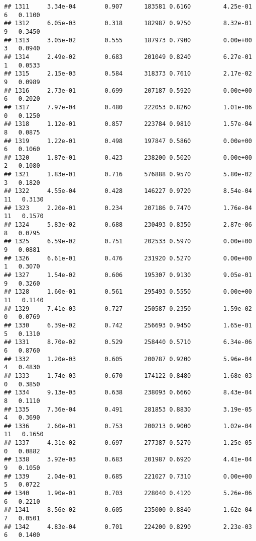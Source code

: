 \documentclass[
]{article}
\begin{document}
\begin{verbatim}
## 1311     3.34e-04        0.907      183581 0.6160         4.25e-01   6   0.1100
## 1312     6.05e-03        0.318      182987 0.9750         8.32e-01   9   0.3450
## 1313     3.05e-02        0.555      187973 0.7900         0.00e+00   3   0.0940
## 1314     2.49e-02        0.683      201049 0.8240         6.27e-01   1   0.0533
## 1315     2.15e-03        0.584      318373 0.7610         2.17e-02   9   0.0989
## 1316     2.73e-01        0.699      207187 0.5920         0.00e+00   6   0.2020
## 1317     7.97e-04        0.480      222053 0.8260         1.01e-06   0   0.1250
## 1318     1.12e-01        0.857      223784 0.9810         1.57e-04   8   0.0875
## 1319     1.22e-01        0.498      197847 0.5860         0.00e+00   6   0.1060
## 1320     1.87e-01        0.423      238200 0.5020         0.00e+00   2   0.1080
## 1321     1.83e-01        0.716      576888 0.9570         5.80e-02   3   0.1820
## 1322     4.55e-04        0.428      146227 0.9720         8.54e-04  11   0.3130
## 1323     2.20e-01        0.234      207186 0.7470         1.76e-04  11   0.1570
## 1324     5.83e-02        0.688      230493 0.8350         2.87e-06   8   0.0795
## 1325     6.59e-02        0.751      202533 0.5970         0.00e+00   9   0.0881
## 1326     6.61e-01        0.476      231920 0.5270         0.00e+00   1   0.3070
## 1327     1.54e-02        0.606      195307 0.9130         9.05e-01   9   0.3260
## 1328     1.60e-01        0.561      295493 0.5550         0.00e+00  11   0.1140
## 1329     7.41e-03        0.727      250587 0.2350         1.59e-02   0   0.0769
## 1330     6.39e-02        0.742      256693 0.9450         1.65e-01   5   0.1310
## 1331     8.70e-02        0.529      258440 0.5710         6.34e-06   6   0.8760
## 1332     1.20e-03        0.605      200787 0.9200         5.96e-04   4   0.4830
## 1333     1.74e-03        0.670      174122 0.8480         1.68e-03   0   0.3850
## 1334     9.13e-03        0.638      238093 0.6660         8.43e-04   8   0.1110
## 1335     7.36e-04        0.491      281853 0.8830         3.19e-05   4   0.3690
## 1336     2.60e-01        0.753      200213 0.9000         1.02e-04  11   0.1650
## 1337     4.31e-02        0.697      277387 0.5270         1.25e-05   0   0.0882
## 1338     3.92e-03        0.683      201987 0.6920         4.41e-04   9   0.1050
## 1339     2.04e-01        0.685      221027 0.7310         0.00e+00   5   0.0722
## 1340     1.90e-01        0.703      228040 0.4120         5.26e-06   6   0.2210
## 1341     8.56e-02        0.605      235000 0.8840         1.62e-04   7   0.0501
## 1342     4.83e-04        0.701      224200 0.8290         2.23e-03   6   0.1400

\end{verbatim}
\end{document}
